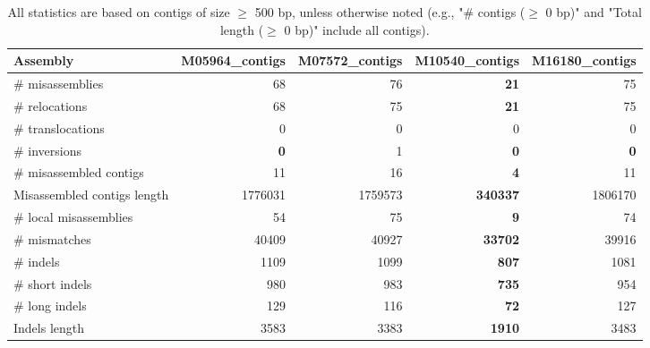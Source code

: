 \documentclass[12pt,a4paper]{article}
\begin{document}
\begin{table}[ht]
\begin{center}
\caption{All statistics are based on contigs of size $\geq$ 500 bp, unless otherwise noted (e.g., "\# contigs ($\geq$ 0 bp)" and "Total length ($\geq$ 0 bp)" include all contigs).}
\begin{tabular}{|l*{4}{|r}|}
\hline
Assembly & M05964\_contigs & M07572\_contigs & M10540\_contigs & M16180\_contigs \\ \hline
\# misassemblies & 68 & 76 & {\bf 21} & 75 \\ \hline
\hspace{5mm}\# relocations & 68 & 75 & {\bf 21} & 75 \\ \hline
\hspace{5mm}\# translocations & 0 & 0 & 0 & 0 \\ \hline
\hspace{5mm}\# inversions & {\bf 0} & 1 & {\bf 0} & {\bf 0} \\ \hline
\# misassembled contigs & 11 & 16 & {\bf 4} & 11 \\ \hline
Misassembled contigs length & 1776031 & 1759573 & {\bf 340337} & 1806170 \\ \hline
\# local misassemblies & 54 & 75 & {\bf 9} & 74 \\ \hline
\# mismatches & 40409 & 40927 & {\bf 33702} & 39916 \\ \hline
\# indels & 1109 & 1099 & {\bf 807} & 1081 \\ \hline
\hspace{5mm}\# short indels & 980 & 983 & {\bf 735} & 954 \\ \hline
\hspace{5mm}\# long indels & 129 & 116 & {\bf 72} & 127 \\ \hline
Indels length & 3583 & 3383 & {\bf 1910} & 3483 \\ \hline
\end{tabular}
\end{center}
\end{table}
\end{document}

